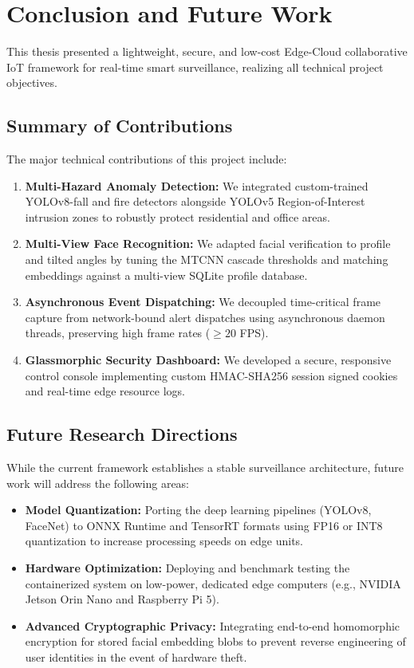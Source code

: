 \documentclass[12pt,a4paper]{article}
\begin{document}
\newpage

\section{Conclusion and Future Work}

This thesis presented a lightweight, secure, and low-cost Edge-Cloud collaborative IoT framework for real-time smart surveillance, realizing all technical project objectives.

\subsection{Summary of Contributions}
The major technical contributions of this project include:
\begin{enumerate}
    \item \textbf{Multi-Hazard Anomaly Detection:} We integrated custom-trained YOLOv8-fall and fire detectors alongside YOLOv5 Region-of-Interest intrusion zones to robustly protect residential and office areas.
    \item \textbf{Multi-View Face Recognition:} We adapted facial verification to profile and tilted angles by tuning the MTCNN cascade thresholds and matching embeddings against a multi-view SQLite profile database.
    \item \textbf{Asynchronous Event Dispatching:} We decoupled time-critical frame capture from network-bound alert dispatches using asynchronous daemon threads, preserving high frame rates ($\ge 20$ FPS).
    \item \textbf{Glassmorphic Security Dashboard:} We developed a secure, responsive control console implementing custom HMAC-SHA256 session signed cookies and real-time edge resource logs.
\end{enumerate}

\subsection{Future Research Directions}
While the current framework establishes a stable surveillance architecture, future work will address the following areas:
\begin{itemize}
    \item \textbf{Model Quantization:} Porting the deep learning pipelines (YOLOv8, FaceNet) to ONNX Runtime and TensorRT formats using FP16 or INT8 quantization to increase processing speeds on edge units.
    \item \textbf{Hardware Optimization:} Deploying and benchmark testing the containerized system on low-power, dedicated edge computers (e.g., NVIDIA Jetson Orin Nano and Raspberry Pi 5).
    \item \textbf{Advanced Cryptographic Privacy:} Integrating end-to-end homomorphic encryption for stored facial embedding blobs to prevent reverse engineering of user identities in the event of hardware theft.
\end{itemize}

\newpage

\printbibliography
\end{document}

